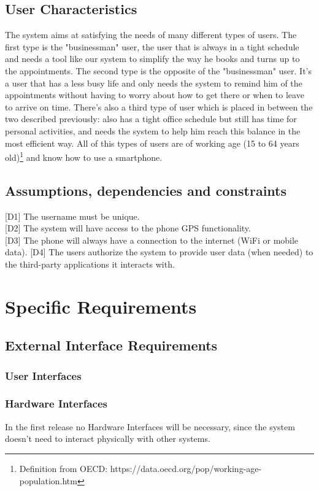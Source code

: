 \documentclass[12pt]{article}
\begin{document}
\subsection{User Characteristics}
The system aims at satisfying the needs of many different types of users. The first type is the "businessman" user, the user that is always in a tight schedule and needs a tool like our system to simplify the way he books and turns up to the appointments. The second type is the opposite of the "businessman" user. It's a user that has a less busy life and only needs the system to remind him of the appointments without having to worry about how to get there or when to leave to arrive on time. There's also a third type of user which is placed in between the two described previously: also has a tight office schedule but still has time for personal activities, and needs the system to help him reach this balance in the most efficient way.
All of this types of users are of working age (15 to 64 years old)\footnote{Definition from OECD: https://data.oecd.org/pop/working-age-population.htm} and know how to use a smartphone.

\subsection{Assumptions, dependencies and constraints}
[D1] The username must be unique.\\{}
[D2] The system will have access to the phone GPS functionality.\\{}
[D3] The phone will always have a connection to the internet (WiFi or mobile data).
[D4] The users authorize the system to provide user data (when needed) to the third-party applications it interacts with.


\section{Specific Requirements}

\subsection{External Interface Requirements}

\subsubsection{User Interfaces}

\subsubsection{Hardware Interfaces}
In the first release no Hardware Interfaces will be necessary, since the system doesn't need to interact physically with other systems.
\end{document}
